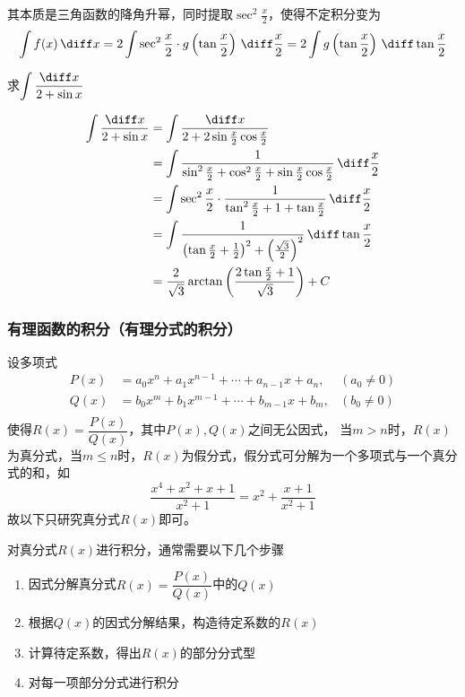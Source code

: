 其本质是三角函数的降角升幂，同时提取$\sec^2\frac{x}{2}$，使得不定积分变为
\[ \int f(x)\,\diff x = 2\int \sec^2\frac{x}{2}\cdot g\left(\tan\frac{x}{2}\right)\,\diff \frac{x}{2} = 2\int g\left(\tan\frac{x}{2}\right)\,\diff \tan\frac{x}{2} \]

\begin{example}
    求$\displaystyle\int\frac{\diff x}{2+\sin x}$
\end{example}
\begin{solution}
    \begin{align*}
        \int\frac{\diff x}{2+\sin x}
         & = \int\frac{\diff x}{2+2\sin\frac{x}{2} \cos\frac{x}{2}}                                                               \\
         & = \int\frac{1}{\sin^2\frac{x}{2} + \cos^2\frac{x}{2} + \sin\frac{x}{2} \cos\frac{x}{2}}\, \diff \frac{x}{2}            \\
         & = \int\sec^2\frac{x}{2} \cdot \frac{1}{\tan^2\frac{x}{2} + 1 + \tan\frac{x}{2}}\,\diff\frac{x}{2}                      \\
         & = \int\frac{1}{\left(\tan\frac{x}{2} + \frac{1}{2}\right)^2 + \left(\frac{\sqrt{3}}{2}\right)^2}\,\diff\tan\frac{x}{2} \\
         & = \frac{2}{\sqrt{3}}\arctan\left(\frac{2\tan\frac{x}{2}+1}{\sqrt{3}}\right) + C
    \end{align*}
\end{solution}

\subsubsection{有理函数的积分（有理分式的积分）}
设多项式
\begin{align*}
    P(x) & = a_0x^n + a_1x^{n-1} + \cdots + a_{n-1}x + a_n, & (a_0\neq 0) \\
    Q(x) & = b_0x^m + b_1x^{m-1} + \cdots + b_{m-1}x + b_m, & (b_0\neq 0) \\
\end{align*}
使得$R(x)=\dfrac{P(x)}{Q(x)}$，其中$P(x),Q(x)$之间无公因式，
当$m>n$时，$R(x)$为真分式，当$m\leq n$时，$R(x)$为假分式，假分式可分解为一个多项式与一个真分式的和，如
\[ \frac{x^4 + x^2 + x + 1}{x^2 + 1} = x^2 + \frac{x + 1}{x^2 + 1} \]
故以下只研究真分式$R(x)$即可。

对真分式$R(x)$进行积分，通常需要以下几个步骤
\begin{enumerate}[(1)]
    \item 因式分解真分式$R(x)=\dfrac{P(x)}{Q(x)}$中的$Q(x)$
    \item 根据$Q(x)$的因式分解结果，构造待定系数的$R(x)$
    \item 计算待定系数，得出$R(x)$的部分分式型
    \item 对每一项部分分式进行积分
\end{enumerate}

